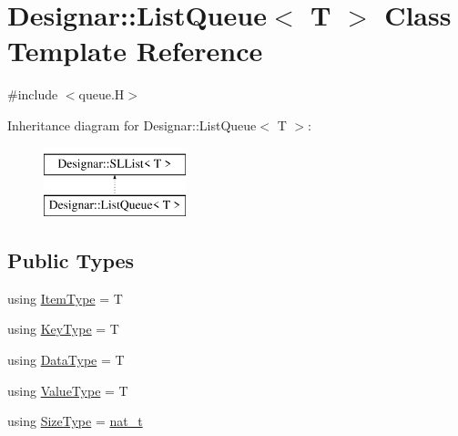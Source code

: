 \hypertarget{class_designar_1_1_list_queue}{}\section{Designar\+:\+:List\+Queue$<$ T $>$ Class Template Reference}
\label{class_designar_1_1_list_queue}


{\ttfamily \#include $<$queue.\+H$>$}

Inheritance diagram for Designar\+:\+:List\+Queue$<$ T $>$\+:\begin{figure}[H]
\begin{center}
\leavevmode
\includegraphics[height=2.000000cm]{class_designar_1_1_list_queue}
\end{center}
\end{figure}
\subsection*{Public Types}
\begin{DoxyCompactItemize}
\item 
using \hyperlink{class_designar_1_1_list_queue_ab2057fd5d92eccf8de8daed70e0182b2}{Item\+Type} = T
\item 
using \hyperlink{class_designar_1_1_list_queue_abb867bba1fa9e40a4bbc27160e5148c5}{Key\+Type} = T
\item 
using \hyperlink{class_designar_1_1_list_queue_a5aae5b0703cf71bce7457e5420d59c8f}{Data\+Type} = T
\item 
using \hyperlink{class_designar_1_1_list_queue_aa5dc35fd7e235c69f4473a96eaae2de3}{Value\+Type} = T
\item 
using \hyperlink{class_designar_1_1_list_queue_a506b74cc71e3d3ad8767ad393b4704b6}{Size\+Type} = \hyperlink{namespace_designar_aa72662848b9f4815e7bf31a7cf3e33d1}{nat\+\_\+t}
\end{DoxyCompactItemize}

